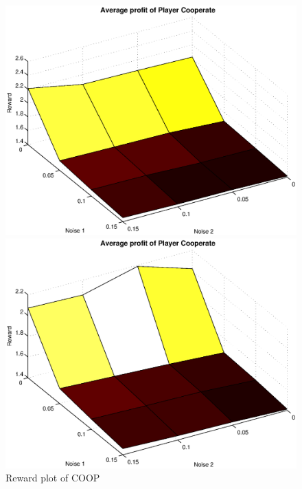 \begin{figure}[h]
	\caption{Reward plot of COOP}
	\label{Pic Cooperative Player}
\begin{minipage}[hbt]{0.65\textwidth}
	\centering
	\includegraphics[width=\textwidth]{pics/simulation1/Reward_vs_Noise_of_Player_Cooperate}
\end{minipage}
\hfill
\begin{minipage}[hbt]{0.3\textwidth}
	\centering
	\includegraphics[width=\textwidth]{pics/simulation2/Reward_vs_Noise_of_Player_Cooperate}
\end{minipage}

\end{figure}

